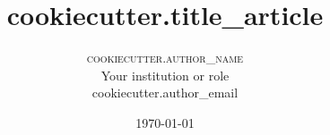 \setlength{\droptitle}{-4\baselineskip} %

\pretitle{\begin{center}\Huge\bfseries} %
\posttitle{\end{center}} %
\title{
  {{cookiecutter.title_article}}
} %
\author{
\textsc{
	  {{cookiecutter.author_name}}
}\\[1ex] %
\normalsize Your institution or role \\
\normalsize {{cookiecutter.author_email}}
}
\date{\today} %
\renewcommand{\maketitlehookd}{
\begin{abstract}
	Lorem ipsum dolor sit amet, consectetur adipiscing elit. Proin cursus
	aliquam turpis, et vulputate arcu laoreet ac. Donec nec metus ornare leo
	tempor vehicula. Nam sit amet porttitor felis. Sed tristique ullamcorper
	imperdiet. Nulla rhoncus vestibulum dolor sit amet mattis. Donec nisi
	quam, venenatis vitae sem id, ullamcorper sollicitudin elit. Curabitur
	maximus velit tempus felis scelerisque, nec mattis est tincidunt.
	Pellentesque nec cursus quam. Ut in lacus vitae enim egestas dignissim.
\end{abstract}
}


